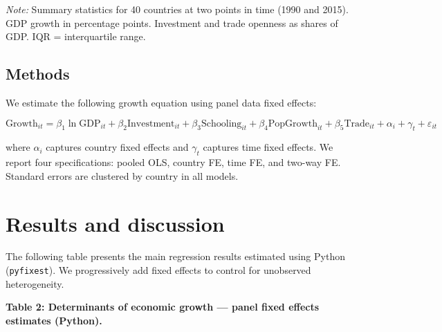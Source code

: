 \documentclass[
  letterpaper,
  DIV=11,
  numbers=noendperiod]{scrartcl}
\begin{document}
\emph{Note:} Summary statistics for 40 countries at two points in time
(1990 and 2015). GDP growth in percentage points. Investment and trade
openness as shares of GDP. IQR = interquartile range.

\subsection{Methods}\label{methods}

We estimate the following growth equation using panel data fixed
effects:

\[
\text{Growth}_{it} = \beta_1 \ln \text{GDP}_{it} + \beta_2 \text{Investment}_{it} + \beta_3 \text{Schooling}_{it} + \beta_4 \text{PopGrowth}_{it} + \beta_5 \text{Trade}_{it} + \alpha_i + \gamma_t + \varepsilon_{it}
\]

where \(\alpha_i\) captures country fixed effects and \(\gamma_t\)
captures time fixed effects. We report four specifications: pooled OLS,
country FE, time FE, and two-way FE. Standard errors are clustered by
country in all models.

\section{Results and discussion}\label{sec-results}

The following table presents the main regression results estimated using
Python (\texttt{pyfixest}). We progressively add fixed effects to
control for unobserved heterogeneity.

\textbf{Table 2: Determinants of economic growth --- panel fixed effects
estimates (Python).}
\end{document}
